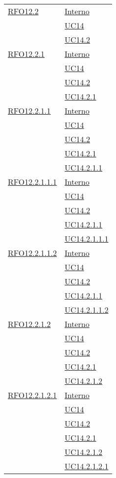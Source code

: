 \begin{longtable}{|>{\centering}m{5cm}|m{5cm}<{\centering}|}
 \hyperlink{RFO12.2}{RFO12.2} 
 & \hyperlink{Interno}{Interno}\\
& \hyperref[UC14]{UC14}\\
& \hyperref[UC14.2]{UC14.2}\\\hline

 \hyperlink{RFO12.2.1}{RFO12.2.1} 
 & \hyperlink{Interno}{Interno}\\
& \hyperref[UC14]{UC14}\\
& \hyperref[UC14.2]{UC14.2}\\
& \hyperref[UC14.2.1]{UC14.2.1}\\\hline

\hyperlink{RFO12.2.1.1}{RFO12.2.1.1} 
 & \hyperlink{Interno}{Interno}\\
& \hyperref[UC14]{UC14}\\
& \hyperref[UC14.2]{UC14.2}\\
& \hyperref[UC14.2.1]{UC14.2.1}\\
& \hyperref[UC14.2.1.1]{UC14.2.1.1}\\\hline

\hyperlink{RFO12.2.1.1.1}{RFO12.2.1.1.1} 
 & \hyperlink{Interno}{Interno}\\
& \hyperref[UC14]{UC14}\\
& \hyperref[UC14.2]{UC14.2}\\
& \hyperref[UC14.2.1.1]{UC14.2.1.1}\\
& \hyperref[UC14.2.1.1.1]{UC14.2.1.1.1}\\\hline

\hyperlink{RFO12.2.1.1.2}{RFO12.2.1.1.2} 
 & \hyperlink{Interno}{Interno}\\
& \hyperref[UC14]{UC14}\\
& \hyperref[UC14.2]{UC14.2}\\
& \hyperref[UC14.2.1.1]{UC14.2.1.1}\\
& \hyperref[UC14.2.1.1.2]{UC14.2.1.1.2}\\\hline

 \hyperlink{RFO12.2.1.2}{RFO12.2.1.2} 
 & \hyperlink{Interno}{Interno}\\
& \hyperref[UC14]{UC14}\\
& \hyperref[UC14.2]{UC14.2}\\
& \hyperref[UC14.2.1]{UC14.2.1}\\
& \hyperref[UC14.2.1.2]{UC14.2.1.2}\\\hline

 \hyperlink{RFO12.2.1.2.1}{RFO12.2.1.2.1} 
 & \hyperlink{Interno}{Interno}\\
& \hyperref[UC14]{UC14}\\
& \hyperref[UC14.2]{UC14.2}\\
& \hyperref[UC14.2.1]{UC14.2.1}\\
& \hyperref[UC14.2.1.2]{UC14.2.1.2}\\
& \hyperref[UC14.2.1.2.1]{UC14.2.1.2.1}\\\hline


\end{longtable}
